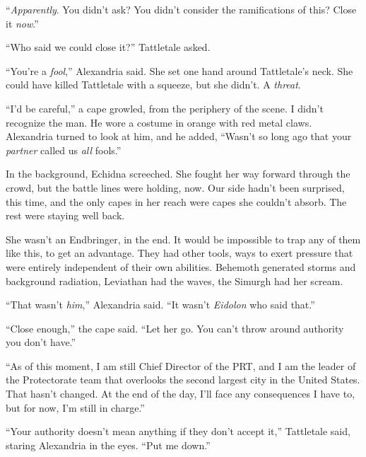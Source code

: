 ``\emph{Apparently}.  You didn't ask?  You didn't consider the ramifications of this?  Close it \emph{now}.''



``Who said we could close it?'' Tattletale asked.



``You're a \emph{fool},'' Alexandria said.  She set one hand around Tattletale's neck.  She could have killed Tattletale with a squeeze, but she didn't.  A \emph{threat}.



``I'd be careful,'' a cape growled, from the periphery of the scene.  I didn't recognize the man.  He wore a costume in orange with red metal claws.  Alexandria turned to look at him, and he added, ``Wasn't so long ago that your \emph{partner }called us \emph{all} fools.''



In the background, Echidna screeched.  She fought her way forward through the crowd, but the battle lines were holding, now.  Our side hadn't been surprised, this time, and the only capes in her reach were capes she couldn't absorb.  The rest were staying well back.



She wasn't an Endbringer, in the end.  It would be impossible to trap any of them like this, to get an advantage.  They had other tools, ways to exert pressure that were entirely independent of their own abilities.  Behemoth generated storms and background radiation, Leviathan had the waves, the Simurgh had her scream.



``That wasn't \emph{him},'' Alexandria said.  ``It wasn't \emph{Eidolon} who said that.''



``Close enough,'' the cape said.  ``Let her go.  You can't throw around authority you don't have.''



``As of this moment, I am still Chief Director of the PRT, and I am the leader of the Protectorate team that overlooks the second largest city in the United States.  That hasn't changed.  At the end of the day, I'll face any consequences I have to, but for now, I'm still in charge.''



``Your authority doesn't mean anything if they don't accept it,'' Tattletale said, staring Alexandria in the eyes.  ``Put me down.''



